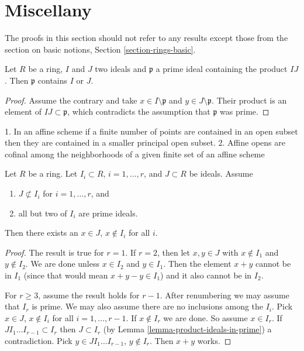 \section{Miscellany}
\label{section-miscellany}

\noindent
The proofs in this section should not refer to any results except
those from the section on basic notions, Section \ref{section-rings-basic}.

\begin{lemma}
\label{lemma-product-ideals-in-prime}
Let $R$ be a ring, $I$ and $J$ two ideals and $\mathfrak p$ a prime ideal
containing the product $IJ$. Then $\mathfrak{p}$ contains $I$ or $J$.
\end{lemma}

\begin{proof}
Assume the contrary and take $x \in I \setminus \mathfrak p$ and
$y \in J \setminus \mathfrak p$. Their product is an element of
$IJ \subset \mathfrak p$, which contradicts the assumption that
$\mathfrak p$ was prime.
\end{proof}

\begin{lemma}
\label{lemma-silly}
\begin{slogan}
1. In an affine scheme if a finite number of points are contained in an
open subset then they are contained in a smaller principal open subset.
2. Affine opens are cofinal among the neighborhoods of a given finite set
of an affine scheme
\end{slogan}
Let $R$ be a ring. Let $I_i \subset R$, $i = 1, \ldots, r$,
and $J \subset R$ be ideals. Assume
\begin{enumerate}
\item $J \not\subset I_i$ for $i = 1, \ldots, r$, and
\item all but two of $I_i$ are prime ideals.
\end{enumerate}
Then there exists an $x \in J$, $x\not\in I_i$ for all $i$.
\end{lemma}

\begin{proof}
The result is true for $r = 1$. If $r = 2$, then let $x, y \in J$ with
$x \not \in I_1$ and $y \not \in I_2$. We are done unless $x \in I_2$
and $y \in I_1$. Then the element $x + y$ cannot be in $I_1$ (since that
would mean $x + y - y \in I_1$) and it also cannot be in $I_2$.

\medskip\noindent
For $r \geq 3$, assume the result holds for $r - 1$. After renumbering
we may assume that $I_r$ is prime. We may also assume there are no
inclusions among the $I_i$. Pick $x \in J$, $x \not \in I_i$ for all
$i = 1, \ldots, r - 1$. If $x \not\in I_r$ we are done. So assume
$x \in I_r$. If $J I_1 \ldots I_{r - 1} \subset I_r$ then
$J \subset I_r$ (by Lemma \ref{lemma-product-ideals-in-prime}) a contradiction.
Pick $y \in J I_1 \ldots I_{r - 1}$, $y \not \in I_r$. Then $x + y$ works.
\end{proof}

